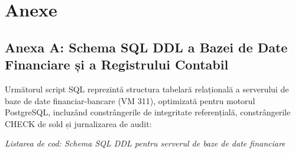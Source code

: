 \chapter*{Anexe}
\appendix

\section*{Anexa A: Schema SQL DDL a Bazei de Date Financiare și a Registrului Contabil}

Următorul script SQL reprezintă structura tabelară relațională a serverului de baze de date financiar-bancare (VM 311), optimizată pentru motorul PostgreSQL, incluzând constrângerile de integritate referențială, constrângerile CHECK de sold și jurnalizarea de audit:

\textit{Listarea de cod: Schema SQL DDL pentru serverul de baze de date financiare}

